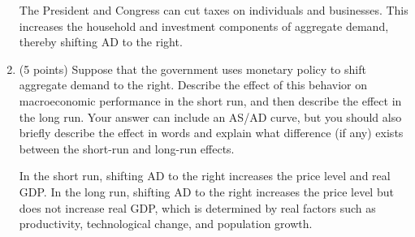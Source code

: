 \documentclass{article}
\begin{document}
\begin{enumerate}
\begin{KEY} The President and Congress can cut taxes on individuals and businesses. This increases the household and investment components of aggregate demand, thereby shifting AD to the right. \end{KEY}

\begin{comment}
\item \begin{EXAM} (5 points) Draw a curve that shows aggregate demand (label it AD) and short- and long-run aggregate supply (label them SRAS and LRAS) when the economy is on a even keel (e.g., is not in a recession or a bubble). Make sure to label your axes carefully!  \vspace{1.3in} \end{EXAM}

\begin{KEY} See figure 7 on page 519 of Mankiw. \end{KEY}
\end{comment}


\item \begin{EXAM} (5 points) Suppose that the government uses monetary policy to shift aggregate demand to the right. Describe the effect of this behavior on macroeconomic performance in the short run, and then describe the effect in the long run. Your answer can include an AS/AD curve, but you should also briefly describe the effect in words and explain what difference (if any) exists between the short-run and long-run effects. \vspace{1in} \end{EXAM}

\begin{KEY} In the short run, shifting AD to the right increases the price level and real GDP. In the long run, shifting AD to the right increases the price level but does not increase real GDP, which is determined by real factors such as productivity, technological change, and population growth. \end{KEY}


\end{enumerate}
\end{document}
